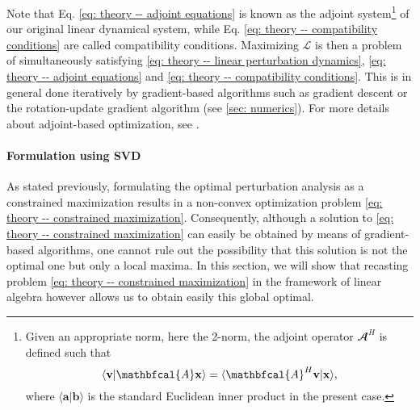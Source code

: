       Note that Eq. \eqref{eq: theory -- adjoint equations} is known as the adjoint system\footnote{
      Given an appropriate norm, here the 2-norm, the adjoint operator $\mathbfcal{A}^H$ is defined such that
      \begin{equation}
        \langle \mathbf{v} \vert \mathbfcal{A} \mathbf{x} \rangle = \langle \mathbfcal{A}^H \mathbf{v} \vert \mathbf{x} \rangle,
        \notag
      \end{equation}
      where $\langle \mathbf{a} \vert \mathbf{b} \rangle$ is the standard Euclidean inner product in the present case.
      }
      of our original linear dynamical system, while Eq. \eqref{eq: theory -- compatibility conditions} are called compatibility conditions. Maximizing $\mathcal{L}$ is then a problem of simultaneously satisfying \eqref{eq: theory -- linear perturbation dynamics}, \eqref{eq: theory -- adjoint equations} and \eqref{eq: theory -- compatibility conditions}. This is in general done iteratively by gradient-based algorithms such as gradient descent or the rotation-update gradient algorithm (see \textsection \ref{sec: numerics}). For more details about adjoint-based optimization, see \cite{book:boyd:2004, nonlinear_optimal:kerswell:2014}.

      \paragraph{Formulation using SVD}
      \label{paragraph: theory -- optimal perturbation svd}

      As stated previously, formulating the optimal perturbation analysis as a constrained maximization results in a non-convex optimization problem \eqref{eq: theory -- constrained maximization}. Consequently, although a solution to \eqref{eq: theory -- constrained maximization} can easily be obtained by means of gradient-based algorithms, one cannot rule out the possibility that this solution is not the optimal one but only a local maxima. In this section, we will show that recasting problem \eqref{eq: theory -- constrained maximization} in the framework of linear algebra however allows us to obtain easily this global optimal.

